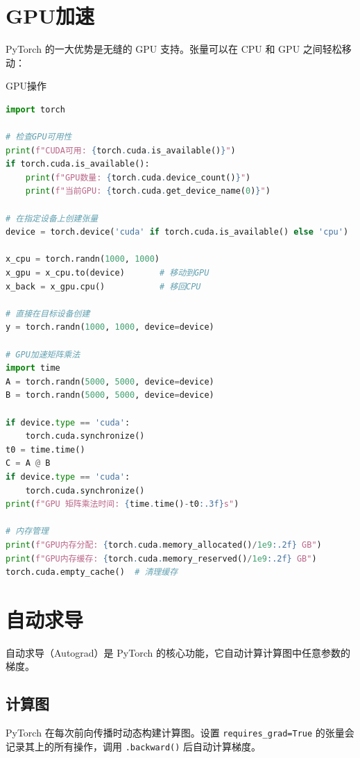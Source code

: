 \section{GPU加速}

PyTorch 的一大优势是无缝的 GPU 支持。张量可以在 CPU 和 GPU 之间轻松移动：

\begin{mycode}{GPU操作}
\begin{lstlisting}[language=Python]
import torch

# 检查GPU可用性
print(f"CUDA可用: {torch.cuda.is_available()}")
if torch.cuda.is_available():
    print(f"GPU数量: {torch.cuda.device_count()}")
    print(f"当前GPU: {torch.cuda.get_device_name(0)}")

# 在指定设备上创建张量
device = torch.device('cuda' if torch.cuda.is_available() else 'cpu')

x_cpu = torch.randn(1000, 1000)
x_gpu = x_cpu.to(device)       # 移动到GPU
x_back = x_gpu.cpu()           # 移回CPU

# 直接在目标设备创建
y = torch.randn(1000, 1000, device=device)

# GPU加速矩阵乘法
import time
A = torch.randn(5000, 5000, device=device)
B = torch.randn(5000, 5000, device=device)

if device.type == 'cuda':
    torch.cuda.synchronize()
t0 = time.time()
C = A @ B
if device.type == 'cuda':
    torch.cuda.synchronize()
print(f"GPU 矩阵乘法时间: {time.time()-t0:.3f}s")

# 内存管理
print(f"GPU内存分配: {torch.cuda.memory_allocated()/1e9:.2f} GB")
print(f"GPU内存缓存: {torch.cuda.memory_reserved()/1e9:.2f} GB")
torch.cuda.empty_cache()  # 清理缓存
\end{lstlisting}
\end{mycode}

\section{自动求导}

自动求导（Autograd）是 PyTorch 的核心功能，它自动计算计算图中任意参数的梯度。

\subsection{计算图}

PyTorch 在每次前向传播时动态构建计算图。设置 \texttt{requires\_grad=True} 的张量会记录其上的所有操作，调用 \texttt{.backward()} 后自动计算梯度。

